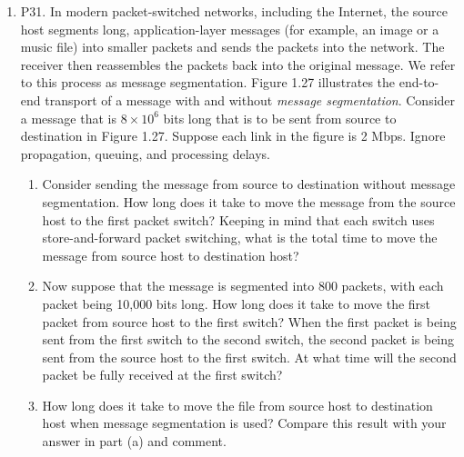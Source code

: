 \documentclass[12pt]{article}
\begin{document}
\begin{enumerate}
\item P31.  In modern packet-switched networks, including the Internet, the source host segments long, application-layer messages (for example, an image or a music file) into smaller packets and sends the packets into the network. The receiver then reassembles the packets back into the original message. We refer to this process as message segmentation. Figure 1.27 illustrates the end-to-end transport of a message with and without \textit{message segmentation}. Consider a message that is \(8 \times 10^6\)  bits long that is to be sent from source to destination in Figure 1.27. Suppose each link in the figure is 2 Mbps. Ignore propagation, queuing, and processing delays.
    \begin{enumerate}
        \item Consider sending the message from source to destination without message segmentation. How long does it take to move the message from the source host to the first packet switch? Keeping in mind that each switch uses store-and-forward packet switching, what is the total time to move the message from source host to destination host?
        \item Now suppose that the message is segmented into 800 packets, with each packet being 10,000 bits long. How long does it take to move the first packet from source host to the first switch? When the first packet is being sent from the first switch to the second switch, the second packet is being sent from the source host to the first switch. At what time will the second packet be fully received at the first switch?
        \item How long does it take to move the file from source host to destination host when message segmentation is used? Compare this result with your answer in part (a) and comment.
    \end{enumerate}

\end{enumerate}
\end{document}
